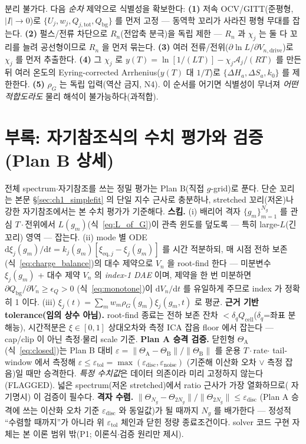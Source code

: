 \documentclass[11pt,a4paper]{article}
\newcommand{\dd}{\mathrm{d}}
\newcommand{\eq}{\mathrm{eq}}
\newcommand{\drive}{\mathrm{drive}}
\newcommand{\bg}{\mathrm{bg}}
\newcommand{\cell}{\mathrm{cell}}
\newcommand{\tot}{\mathrm{tot}}
\begin{document}
분리 불가다. 다음 \emph{순차} 제약으로 식별성을 확보한다: \textbf{(1)} 저속 OCV/GITT(준평형, $|I|\to0$)로
$\{U_j,w_j,Q_{j,\tot},Q_\bg\}$ 를 먼저 고정 — 동역학 꼬리가 사라진 평형 무대를 잡는다. \textbf{(2)} 펄스/전류
차단으로 $R_n$(전압축 분극)을 독립 제한 — $R_n$ 과 $\chi_j$ 는 둘 다 꼬리를 늘려 공선형이므로 $R_n$ 을 먼저
묶는다. \textbf{(3)} 여러 전류/전위($\partial\ln L/\partial V_{n,\drive}$)로 $\chi_j$ 를 먼저 추출한다.
\textbf{(4)} 그 $\chi_j$ 로 $y(T)=\ln[1/(LT)]-\chi_j\mathcal A_j/(RT)$ 를 만든 뒤 여러 온도의 Eyring-corrected Arrhenius($y(T)$ 대 $1/T$)로
$\{\Delta H_a,\Delta S_a,k_0\}$ 를 제한한다. \textbf{(5)} $\rho_G$ 는 독립 입력(역산 금지, N4).
이 순서를 어기면 식별성이 무너져 \emph{어떤 적합도라도} 물리 해석이 불가능하다(과적합).

\section{부록: 자기참조식의 수치 평가와 검증 (Plan B 상세)}\label{sec:ch1_numeric}
전체 spectrum$\cdot$자기참조를 쓰는 정밀 평가는 Plan B(직접 $g$-grid)로 푼다. 단순 꼬리는 본문
\S\ref{sec:ch1_simplefit} 의 단일 지수 근사로 충분하나, stretched 꼬리(저온)나 강한 자기참조에서는 본 수치
평가가 기준해다.
\textbf{스킴.} (i) 배리어 격자 $\{g_m\}_{m=1}^{N_g}$ 를 관심 $T\cdot$전위에서 $L(g_m)$(식~\eqref{eq:L_of_G})이
관측 윈도를 덮도록 — 특히 large-$L$(긴 꼬리) 영역 — 잡는다. (ii) mode 별 ODE
$\dd\xi_j(g_m)/\dd t=k_j(g_m)[\xi_{\eq,j}-\xi_j(g_m)]$ 를 시간 적분하되, 매 시점 전하 보존
(식~\eqref{eq:charge_balance})의 대수 제약으로 $V_n$ 을 root-find 한다 — 미분변수 $\xi_j(g_m)$ + 대수 제약
$V_n$ 의 \emph{index-1 DAE} 이며, 제약을 한 번 미분하면 $\partial Q_\bg/\partial V_n\ge\epsilon_Q>0$
(식~\eqref{eq:monotone})이 $\dd V_n/\dd t$ 를 유일하게 주므로 index 가 정확히 1 이다. (iii)
$\xi_j(t)=\sum_m w_m\rho_G(g_m)\xi_j(g_m,t)$ 로 평균.
\textbf{근거 기반 tolerance(임의 상수 아님).} root-find 종료는 전하 보존 잔차 $<\delta_q Q_\cell$($\delta_q$=좌표
분해능), 시간적분은 $\xi\in[0,1]$ 상대오차와 측정 ICA 잡음 floor 에서 잡는다 — cap/clip 이 아닌 측정$\cdot$물리
scale 기준.
\textbf{Plan A 승격 검증.} 닫힌형 $\Theta_\mathrm A$(식~\eqref{eq:closed})는 Plan B 대비
$\varepsilon=\lVert\Theta_\mathrm A-\Theta_\mathrm B\rVert/\lVert\Theta_\mathrm B\rVert$ 를 운용 $T\cdot$rate$\cdot$
tail-window 에서 측정해 $\varepsilon\le\varepsilon_{\mathrm{tol}}=\max(\varepsilon_{\mathrm{disc}},\varepsilon_{\mathrm{noise}})$
(기준해 이산화 오차 $\vee$ 측정 잡음)일 때만 승격한다. \emph{특정 수치값}은 데이터 의존이라 미리 고정하지 않는다(FLAGGED). 넓은
spectrum(저온 stretched)에서 ratio 근사가 가장 열화하므로(\cite{jcp2017} 자기명시) 이 검증이 필수다.
\textbf{격자 수렴.} $\lVert\Theta_{N_g}-\Theta_{2N_g}\rVert/\lVert\Theta_{2N_g}\rVert\le\varepsilon_{\mathrm{disc}}$
(Plan A 승격에 쓰는 이산화 오차 기준 $\varepsilon_{\mathrm{disc}}$ 와 동일값)가 될 때까지 $N_g$ 를 배가한다 —
정성적 ``수렴할 때까지''가 아니라 위 $\varepsilon_{\mathrm{tol}}$ 체인과 닫힌 정량 종료조건이다. solver 코드 구현
자체는 본 이론 범위 밖(P1; 이론식$\cdot$검증 원리만 제시).
\end{document}
